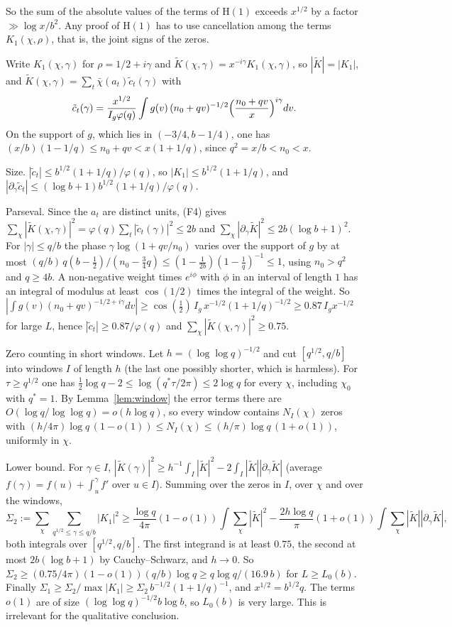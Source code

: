 \documentclass[11pt]{amsart}
\makeatletter
\theoremstyle{definition}
\numberwithin{equation}{section}
\renewenvironment{proof}[1][\proofname]{\par\pushQED{\qed}\normalfont\topsep6\p@\@plus6\p@\relax\trivlist\item[\hskip\labelsep\upshape#1.]\ignorespaces}{\popQED\endtrivlist\@endpefalse}
\makeatother
\begin{document}
So the sum of the absolute values of the terms of $\mathrm H(1)$ exceeds $x^{1/2}$ by a factor $\gg\log x/b^2$. Any proof of $\mathrm H(1)$ has to use cancellation among the terms $K_1(\chi,\rho)$, that is, the joint signs of the zeros.

\begin{proof}
Write $K_1(\chi,\gamma)$ for $\rho=1/2+i\gamma$ and $\tilde K(\chi,\gamma)=x^{-i\gamma}K_1(\chi,\gamma)$, so $|\tilde K|=|K_1|$, and $\tilde K(\chi,\gamma)=\sum_t\bar\chi(a_t)\tilde c_t(\gamma)$ with
\[
\tilde c_t(\gamma)=\frac{x^{1/2}}{I_g\varphi(q)}\int g(v)\,(n_0+qv)^{-1/2}\Bigl(\frac{n_0+qv}{x}\Bigr)^{i\gamma}dv.
\]
On the support of $g$, which lies in $(-3/4,b-1/4)$, one has $(x/b)(1-1/q)\le n_0+qv<x(1+1/q)$, since $q^2=x/b<n_0<x$.

Size. $|\tilde c_t|\le b^{1/2}(1+1/q)/\varphi(q)$, so $|K_1|\le b^{1/2}(1+1/q)$, and $|\partial_\gamma\tilde c_t|\le(\log b+1)b^{1/2}(1+1/q)/\varphi(q)$.

Parseval. Since the $a_t$ are distinct units, (F4) gives $\sum_\chi|\tilde K(\chi,\gamma)|^2=\varphi(q)\sum_t|\tilde c_t(\gamma)|^2\le2b$ and $\sum_\chi|\partial_\gamma\tilde K|^2\le2b(\log b+1)^2$. For $|\gamma|\le q/b$ the phase $\gamma\log(1+qv/n_0)$ varies over the support of $g$ by at most $(q/b)\,q(b-\frac12)/(n_0-\frac34q)\le(1-\frac1{2b})(1-\frac1q)^{-1}\le1$, using $n_0>q^2$ and $q\ge4b$. A non-negative weight times $e^{i\phi}$ with $\phi$ in an interval of length $1$ has an integral of modulus at least $\cos(1/2)$ times the integral of the weight. So $|\int g(v)(n_0+qv)^{-1/2+i\gamma}dv|\ge\cos(\frac12)\,I_g\,x^{-1/2}(1+1/q)^{-1/2}\ge0.87\,I_gx^{-1/2}$ for large $L$, hence $|\tilde c_t|\ge0.87/\varphi(q)$ and $\sum_\chi|\tilde K(\chi,\gamma)|^2\ge0.75$.

Zero counting in short windows. Let $h=(\log\log q)^{-1/2}$ and cut $[q^{1/2},q/b]$ into windows $I$ of length $h$ (the last one possibly shorter, which is harmless). For $\tau\ge q^{1/2}$ one has $\frac12\log q-2\le\log(q^*\tau/2\pi)\le2\log q$ for every $\chi$, including $\chi_0$ with $q^*=1$. By Lemma~\ref{lem:window} the error terms there are $O(\log q/\log\log q)=o(h\log q)$, so every window contains $N_I(\chi)$ zeros with $(h/4\pi)\log q\,(1-o(1))\le N_I(\chi)\le(h/\pi)\log q\,(1+o(1))$, uniformly in $\chi$.

Lower bound. For $\gamma\in I$, $|\tilde K(\gamma)|^2\ge h^{-1}\int_I|\tilde K|^2-2\int_I|\tilde K||\partial_\gamma\tilde K|$ (average $f(\gamma)=f(u)+\int_u^\gamma f'$ over $u\in I$). Summing over the zeros in $I$, over $\chi$ and over the windows,
\[
\Sigma_2:=\sum_\chi\sum_{q^{1/2}\le\gamma\le q/b}|K_1|^2\ge\frac{\log q}{4\pi}(1-o(1))\int\sum_\chi|\tilde K|^2-\frac{2h\log q}{\pi}(1+o(1))\int\sum_\chi|\tilde K||\partial_\gamma\tilde K|,
\]
both integrals over $[q^{1/2},q/b]$. The first integrand is at least $0.75$, the second at most $2b(\log b+1)$ by Cauchy--Schwarz, and $h\to0$. So $\Sigma_2\ge(0.75/4\pi)(1-o(1))(q/b)\log q\ge q\log q/(16.9\,b)$ for $L\ge L_0(b)$. Finally $\Sigma_1\ge\Sigma_2/\max|K_1|\ge\Sigma_2\,b^{-1/2}(1+1/q)^{-1}$, and $x^{1/2}=b^{1/2}q$. The terms $o(1)$ are of size $(\log\log q)^{-1/2}b\log b$, so $L_0(b)$ is very large. This is irrelevant for the qualitative conclusion.
\end{proof}
\end{document}
